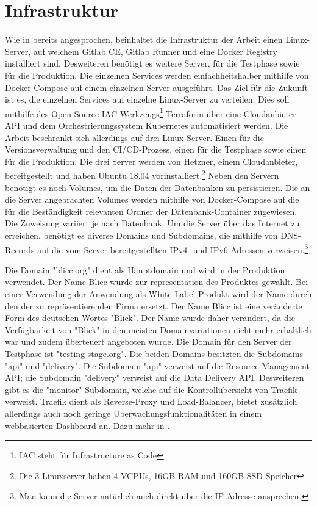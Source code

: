 \section{Infrastruktur}
\label{sec:infrastruktur}
Wie in  bereits angesprochen, beinhaltet die Infrastruktur
der Arbeit einen Linux-Server, auf welchem Gitlab CE, Gitlab Runner und eine Docker Registry
installiert sind. Desweiteren benötigt es weitere Server, für die Testphase sowie für
die Produktion. Die einzelnen Services werden einfachheitshalber mithilfe von Docker-Compose
auf einem einzelnen Server ausgeführt. Das Ziel für die Zukunft ist es, die einzelnen
Services auf einzelne Linux-Server zu verteilen. Dies soll mithilfe des Open Source IAC-Werkzeugs\footnote{IAC steht für Infrastructure as Code}
Terraform über eine Cloudanbieter-API und dem Orchestrierungssystem Kubernetes automatisiert werden.
Die Arbeit beschränkt sich allerdings auf drei Linux-Server. Einen für die Versionsverwaltung
und den CI/CD-Prozess, einen für die Testphase sowie einen für die Produktion. 
Die drei Server werden von Hetzner, einem Cloudanbieter, bereitgestellt und haben Ubuntu 18.04
vorinstalliert.\footnote{Die 3 Linuxserver haben 4 VCPUs, 16GB RAM und 160GB SSD-Speicher} 
Neben den Servern benötigt es noch Volumes, um die Daten der Datenbanken zu persistieren.
Die an die Server angebrachten Volumes werden mithilfe von Docker-Compose auf die für die
Beständigkeit relevanten Ordner der Datenbank-Container zugewiesen. Die Zuweisung variiert
je nach Datenbank. Um die Server über das Internet zu erreichen, benötigt es diverse Domains
und Subdomains, die mithilfe von DNS-Records auf die vom Server bereitgestellten
IPv4- und IPv6-Adressen verweisen.\footnote{Man kann die Server natürlich auch direkt über die IP-Adresse ansprechen.}

Die Domain "blicc.org" dient als Hauptdomain und wird in der Produktion verwendet. Der Name Blicc
wurde zur representation des Produktes gewählt. Bei einer Verwendung der Anwendung als White-Label-Produkt
wird der Name durch den der zu repräsentierenden Firma ersetzt. Der Name Blicc ist eine
veränderte Form des deutschen Wortes "Blick". Der Name wurde daher verändert, da die Verfügbarkeit
von "Blick" in den meisten Domainvariationen nicht mehr erhältlich war und zudem
überteuert angeboten wurde. Die Domain für den Server der Testphase ist "testing-stage.org".
Die beiden Domains besitzten die Subdomains "api" und "delivery". Die Subdomain "api" verweist
auf die Resource Management API; die Subdomain "delivery" verweist auf die Data Delivery API.
Desweiteren gibt es die "monitor" Subdomain, welche auf die Kontrollübersicht von Traefik
verweist. Traefik dient als Reverse-Proxy und Load-Balancer, bietet zusätzlich allerdings
auch noch geringe Überwachungsfunktionalitäten in einem webbasierten Dashboard an.
Dazu mehr in .


